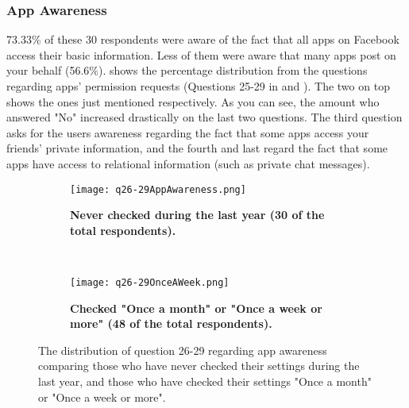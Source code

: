 \subsubsection{App Awareness}
73.33\% of these 30 respondents were aware of the fact that all apps on Facebook access their basic information. Less of them were aware that many apps post on your behalf (56.6\%).  shows the percentage distribution from the questions regarding apps' permission requests (Questions 25-29 in  and ). The two on top shows the ones just mentioned respectively. As you can see, the amount who answered "No" increased drastically on the last two questions. The third question asks for the users awareness regarding the fact that some apps access your friends' private information, and the fourth and last regard the fact that some apps have access to relational information (such as private chat messages). 


\begin{figure}
        \centering
        \begin{subfigure}[t]{0.5\textwidth}
            \texttt{[image: q26-29AppAwareness.png]}
			\caption[The distribution of question 26-29, showing app 					awareness among the 30 respondents that have never checked 					their Facebook settings during the last year]
			{\textbf{Never checked during the last year (30 of the total				respondents).}} 
			\label{fig:appawarenessneverchecked}
		\end{subfigure}%
		 ~ %
        \begin{subfigure}[t]{0.5\textwidth}
            \texttt{[image: q26-29OnceAWeek.png]}
			\caption[The distribution of question 26-29 showing app 					awareness among the 48 respondents that checks their Facebook 			settings "Once a month" or "Once a week or more"]
			{\textbf{Checked "Once a month" or "Once a week or more" (48 				of the total respondents).}} 
			\label{fig:appawarenessonceaweek}
        \end{subfigure}
        \caption{The distribution of question 26-29 regarding app awareness comparing those who have never checked their settings during the last year, and those who have checked their settings "Once a month" or "Once a week or more".}
\label{fig:appawarenessinregardtohowoftentheycheck}
\end{figure}




